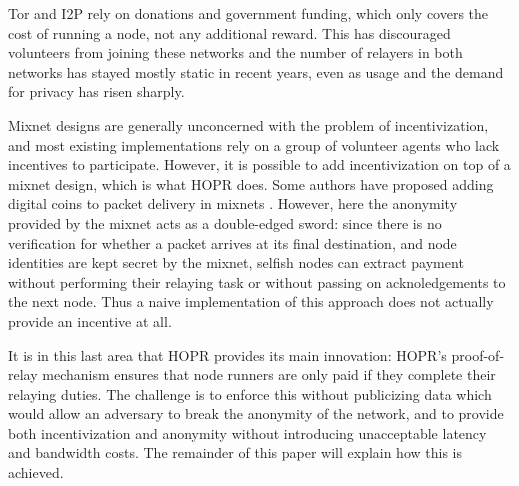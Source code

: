 Tor and I2P rely on donations and government funding, which only covers the cost of running a node, not any additional reward. This has discouraged volunteers from joining these networks and the number of relayers in both networks has stayed mostly static in recent years, even as usage and the demand for privacy has risen sharply.

Mixnet designs are generally unconcerned with the problem of incentivization, and most existing implementations rely on a group of volunteer agents who lack incentives to participate. However, it is possible to add incentivization on top of a mixnet design, which is what HOPR does. Some authors have proposed adding digital coins to packet delivery in mixnets \cite{MixnetCoins}. However, here the anonymity provided by the mixnet acts as a double-edged sword: since there is no verification for whether a packet arrives at its final destination, and node identities are kept secret by the mixnet, selfish nodes can extract payment without performing their relaying task or without passing on acknoledgements to the next node. Thus a naive implementation of this approach does not actually provide an incentive at all.

It is in this last area that HOPR provides its main innovation: HOPR's proof-of-relay mechanism ensures that node runners are only paid if they complete their relaying duties. The challenge is to enforce this without publicizing data which would allow an adversary to break the anonymity of the network, and to provide both incentivization and anonymity without introducing unacceptable latency and bandwidth costs. The remainder of this paper will explain how this is achieved.
